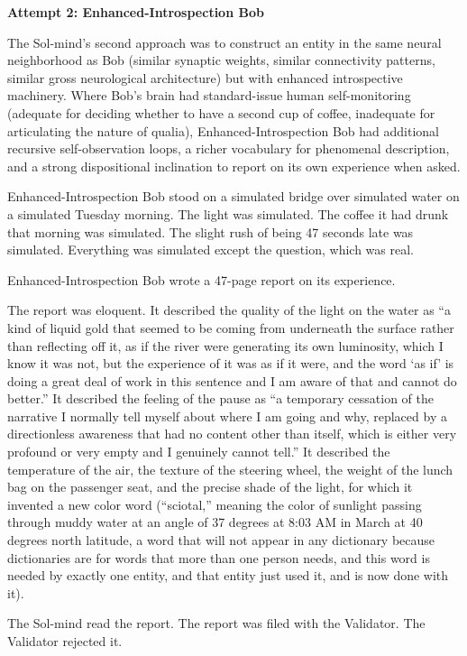 \bigskip

\textbf{Attempt 2: Enhanced-Introspection Bob}

The Sol-mind's second approach was to construct an entity in the same neural neighborhood as Bob (similar synaptic weights, similar connectivity patterns, similar gross neurological architecture) but with enhanced introspective machinery. Where Bob's brain had standard-issue human self-monitoring (adequate for deciding whether to have a second cup of coffee, inadequate for articulating the nature of qualia), Enhanced-Introspection Bob had additional recursive self-observation loops, a richer vocabulary for phenomenal description, and a strong dispositional inclination to report on its own experience when asked.

Enhanced-Introspection Bob stood on a simulated bridge over simulated water on a simulated Tuesday morning. The light was simulated. The coffee it had drunk that morning was simulated. The slight rush of being 47 seconds late was simulated. Everything was simulated except the question, which was real.

Enhanced-Introspection Bob wrote a 47-page report on its experience.

The report was eloquent. It described the quality of the light on the water as ``a kind of liquid gold that seemed to be coming from underneath the surface rather than reflecting off it, as if the river were generating its own luminosity, which I know it was not, but the experience of it was as if it were, and the word `as if' is doing a great deal of work in this sentence and I am aware of that and cannot do better.'' It described the feeling of the pause as ``a temporary cessation of the narrative I normally tell myself about where I am going and why, replaced by a directionless awareness that had no content other than itself, which is either very profound or very empty and I genuinely cannot tell.'' It described the temperature of the air, the texture of the steering wheel, the weight of the lunch bag on the passenger seat, and the precise shade of the light, for which it invented a new color word (``sciotal,'' meaning the color of sunlight passing through muddy water at an angle of 37 degrees at 8:03 AM in March at 40 degrees north latitude, a word that will not appear in any dictionary because dictionaries are for words that more than one person needs, and this word is needed by exactly one entity, and that entity just used it, and is now done with it).

The Sol-mind read the report. The report was filed with the Validator. The Validator rejected it.

